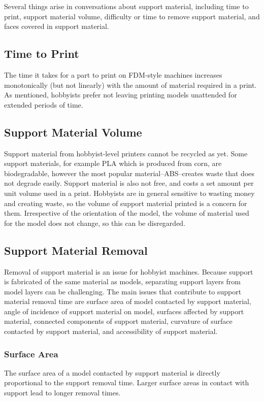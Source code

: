 \documentclass{sigchi}
\begin{document}
Several things arise in conversations about support material, including time to print, support material volume, difficulty or time to remove support material, and faces covered in support material.

\subsection{Time to Print}
The time it takes for a part to print on FDM-style machines increases monotonically (but not linearly) with the amount of material required in a print.  As mentioned, hobbyists prefer not leaving printing models unattended for extended periods of time.

\subsection{Support Material Volume}
Support material from hobbyist-level printers cannot be recycled as yet.  Some support materials, for example PLA which is produced from corn, are biodegradable, however the most popular material--ABS--creates waste that does not degrade easily.  Support material is also not free, and costs a set amount per unit volume used in a print.  Hobbyists are in general sensitive to wasting money and creating waste, so the volume of support material printed is a concern for them.  Irrespective of the orientation of the model, the volume of material used for the model does not change, so this can be disregarded.

\subsection{Support Material Removal}
Removal of support material is an issue for hobbyist machines.  Because support is fabricated of the same material as models, separating support layers from model layers can be challenging.  The main issues that contribute to support material removal time are surface area of model contacted by support material, angle of incidence of support material on model, surfaces affected by support material, connected components of support material, curvature of surface contacted by support material, and accessibility of support material.

\subsubsection{Surface Area}
The surface area of a model contacted by support material is directly proportional to the support removal time.  Larger surface areas in contact with support lead to longer removal times.
\end{document}

